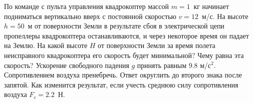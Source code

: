 
По команде с пульта управления квадрокоптер массой $m = 1$~кг начинает подниматься вертикально вверх с постоянной 
скоростью $v=12$~м/с. На высоте $h=50$~м от поверхности Земли в результате сбоя в электрической цепи пропеллеры 
квадрокоптера останавливаются, и через некоторое время он падает на Землю. На какой высоте $H$ от поверхности 
Земли за время полета неисправного квадрокоптера его скорость  будет минимальной? Чему равна эта скорость?  
Ускорение свободного падения $g$ принять равным $9.8$ м/с$^2$. Сопротивлением воздуха пренебречь. Ответ округлить 
до второго знака после запятой. Как изменится результат, если учесть среднюю силу сопротивления воздуха $F_c = 2.2$~Н.